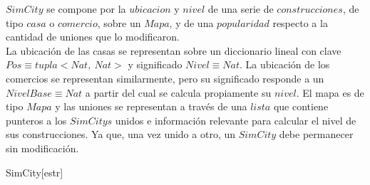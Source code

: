\begin{Representacion}
  
    $SimCity$ se compone por la $ubicacion$ y $nivel$ de una serie de $construcciones$, de tipo $casa$ o $comercio$, sobre un $Mapa$, y de una $popularidad$ respecto a la cantidad de uniones que lo modificaron. \\
    
    La ubicación de las casas se representan sobre un diccionario lineal con clave $Pos \equiv tupla<Nat,\ Nat>$ y significado $Nivel \equiv Nat$. La ubicación de los comercios se representan similarmente, pero su significado responde a un $NivelBase \equiv Nat$ a partir del cual se calcula propiamente su $nivel$. El mapa es de tipo $Mapa$ y las uniones se representan a través de una $lista$ que contiene
    punteros a los $SimCitys$ unidos e información relevante para calcular el nivel de sus construcciones. Ya que, una vez unido a otro, un $SimCity$ debe permanecer sin modificación. 
  

    \begin{Estructura}{SimCity}[estr]
        \begin{Tupla}[estr]
        \end{Tupla}
        
        \vspace{2mm}
        \begin{Tupla}[hijo]
        \end{Tupla}
        

\end{Estructura}
\end{Representacion}
